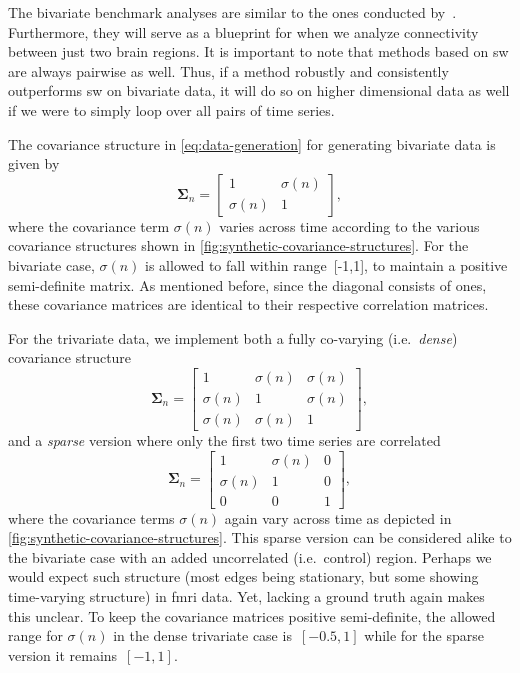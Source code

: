 The bivariate benchmark analyses are similar to the ones conducted by~\textcite{Lindquist2014}.
Furthermore, they will serve as a blueprint for when we analyze connectivity between just two brain regions.
It is important to note that methods based on \gls{sw} are always pairwise as well.
Thus, if a method robustly and consistently outperforms \gls{sw} on bivariate data, it will do so on higher dimensional data as well if we were to simply loop over all pairs of time series.

The covariance structure in \cref{eq:data-generation} for generating bivariate data is given by
\begin{equation}
  \mathbf{\Sigma}_n = \begin{bmatrix}
    1 & \sigma(n) \\
    \sigma(n) & 1
  \end{bmatrix},
\end{equation}
where the covariance term $\sigma(n)$ varies across time according to the various covariance structures shown in \cref{fig:synthetic-covariance-structures}.
For the bivariate case, $\sigma(n)$ is allowed to fall within range~[-1,1], to maintain a positive semi-definite matrix.
As mentioned before, since the diagonal consists of ones, these covariance matrices are identical to their respective correlation matrices.

For the trivariate data, we implement both a fully co-varying (i.e.~\emph{dense}) covariance structure
\begin{equation}
  \mathbf{\Sigma}_n = \begin{bmatrix}
    1 & \sigma(n) & \sigma(n) \\
    \sigma(n) & 1 & \sigma(n) \\
    \sigma(n) & \sigma(n) & 1
  \end{bmatrix},
\end{equation}
and a \emph{sparse} version where only the first two time series are correlated
\begin{equation}
  \mathbf{\Sigma}_n = \begin{bmatrix}
    1 & \sigma(n) & 0 \\
    \sigma(n) & 1 & 0 \\
    0 & 0 & 1
  \end{bmatrix},
\end{equation}
where the covariance terms $\sigma(n)$ again vary across time as depicted in \cref{fig:synthetic-covariance-structures}.
This sparse version can be considered alike to the bivariate case with an added uncorrelated (i.e.~control) region.
Perhaps we would expect such structure (most edges being stationary, but some showing time-varying structure) in \gls{fmri} data.
Yet, lacking a ground truth again makes this unclear.
To keep the covariance matrices positive semi-definite, the allowed range for $\sigma(n)$ in the dense trivariate case is~$[-0.5,1]$ while for the sparse version it remains~$[-1,1]$.

